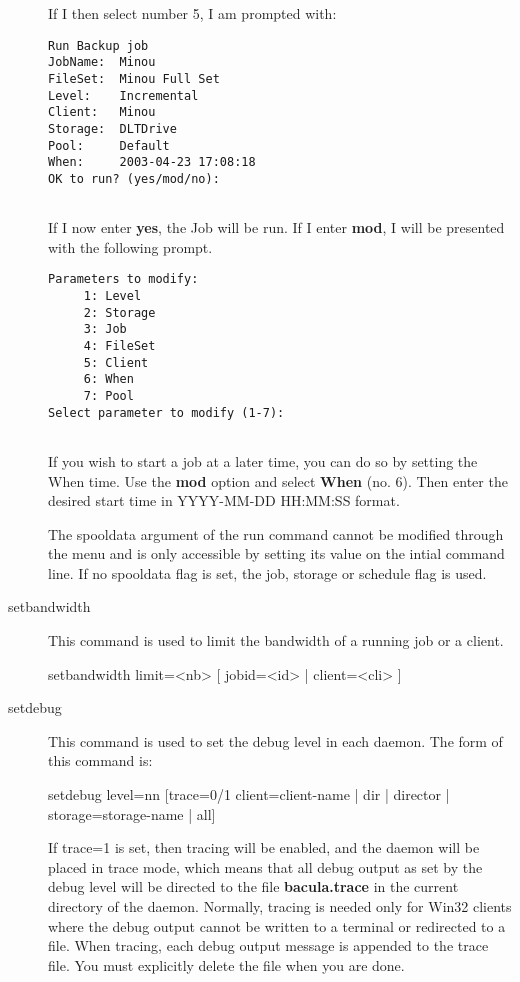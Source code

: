 \begin{description}
\begin{verbatim}
\end{verbatim}
\normalsize

If I then select number 5, I am prompted with:  

\footnotesize
\begin{verbatim}
Run Backup job
JobName:  Minou
FileSet:  Minou Full Set
Level:    Incremental
Client:   Minou
Storage:  DLTDrive
Pool:     Default
When:     2003-04-23 17:08:18
OK to run? (yes/mod/no):
     
\end{verbatim}
\normalsize

If I now enter {\bf yes}, the Job will be run. If I enter {\bf mod},  I will
be presented with the following prompt.  

\footnotesize
\begin{verbatim}
Parameters to modify:
     1: Level
     2: Storage
     3: Job
     4: FileSet
     5: Client
     6: When
     7: Pool
Select parameter to modify (1-7):
     
\end{verbatim}
\normalsize

If you wish to start a job at a later time, you can do so by setting  the When
time. Use the {\bf mod} option and select {\bf When} (no. 6).  Then enter the
desired start time in YYYY-MM-DD HH:MM:SS format.

The spooldata argument of the run command cannot be modified through the menu
and is only accessible by setting its value on the intial command line. If
no spooldata flag is set, the job, storage or schedule flag is used.

\item[setbandwidth] 
  This command is used to limit the bandwidth of a running job or a client.

setbandwidth limit=<nb> [ jobid=<id> | client=<cli> ]

\item [setdebug]
   This command is used to set the debug level in each  daemon. The form of this
   command is:

setdebug level=nn [trace=0/1 client=\lt{}client-name\gt{} | dir | director |
  storage=\lt{}storage-name\gt{} | all]  

   If trace=1 is set, then tracing will be enabled, and the daemon will be
   placed in trace mode, which means that all debug output as set by the
   debug level will be directed to the file {\bf bacula.trace} in the
   current directory of the daemon.  Normally, tracing is needed only for
   Win32 clients where the debug output cannot be written to a terminal or
   redirected to a file.  When tracing, each debug output message is
   appended to the trace file.  You must explicitly delete the file when
   you are done.


\end{description}
